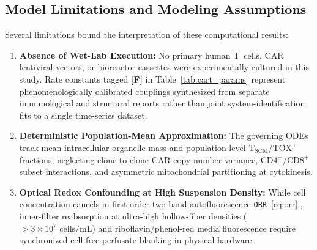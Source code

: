 \documentclass[11pt]{article}
\theoremstyle{plain}
\theoremstyle{remark}
\begin{document}
\subsection{Model Limitations and Modeling Assumptions}
Several limitations bound the interpretation of these computational results:
\begin{enumerate}
  \item \textbf{Absence of Wet-Lab Execution:} No primary human T~cells, CAR lentiviral vectors, or bioreactor cassettes were experimentally cultured in this study. Rate constants tagged \textbf{[F]} in Table~\ref{tab:cart_params} represent phenomenologically calibrated couplings synthesized from separate immunological and structural reports \cite{fraietta2018determinants,doan2024foxo1,chan2024foxo1,denk2022immunity} rather than joint system-identification fits to a single time-series dataset.
  \item \textbf{Deterministic Population-Mean Approximation:} The governing ODEs track mean intracellular organelle mass and population-level $\mathrm{T}_{\mathrm{SCM}}$/$\mathrm{TOX}^+$ fractions, neglecting clone-to-clone CAR copy-number variance, $\text{CD4}^+/\text{CD8}^+$ subset interactions, and asymmetric mitochondrial partitioning at cytokinesis.
  \item \textbf{Optical Redox Confounding at High Suspension Density:} While cell concentration cancels in first-order two-band autofluorescence \texttt{ORR}~\eqref{eq:orr} \cite{walsh2021omi}, inner-filter reabsorption at ultra-high hollow-fiber densities ($>3 \times 10^7\text{ cells/mL}$) and riboflavin/phenol-red media fluorescence require synchronized cell-free perfusate blanking in physical hardware.
\end{enumerate}
\end{document}
